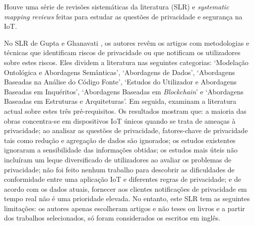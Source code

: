 \documentclass[conference]{IEEEtran}
\begin{document}
Houve uma série de revisões sistemáticas da literatura (SLR) \cite{Gupta2022Privacy, Kuhtreiber2022survey, sicari2015security, LinSurvey}
e \textit{systematic mapping reviews} \cite{porras2018security, ahmed2019aspects}
feitas para estudar as questões de privacidade e segurança na IoT.


No SLR de Gupta e Ghanavati \cite{Gupta2022Privacy}, os autores revêm os
artigos com metodologias e técnicas que identificam riscos de privacidade
ou que notificam os utilizadores sobre estes riscos. Eles dividem a literatura
nas seguintes categorias: `Modelação Ontológica e Abordagens Semânticas',
`Abordagens de Dados', `Abordagens Baseadas na Análise do Código Fonte',
`Estudos do Utilizador e Abordagens Baseadas em Inquéritos', `Abordagens
Baseadas em \textit{Blockchain}' e `Abordagens Baseadas em Estruturas e Arquiteturas'.
Em seguida, examinam a literatura actual sobre estes três pré-requisitos.
Os resultados mostram que: a maioria das obras concentra-se em dispositivos
IoT únicos quando se trata de ameaças à privacidade; ao analisar as questões
de privacidade, fatores-chave de privacidade tais como redução e agregação
de dados são ignorados; os estudos existentes ignoraram a sensibilidade das
informações obtidas; os estudos mais úteis não incluíram um leque diversificado
de utilizadores ao avaliar os problemas de privacidade; não foi feito nenhum
trabalho para descobrir as dificuldades de conformidade entre uma aplicação
IoT e diferentes regras de privacidade; e de acordo com os dados atuais,
fornecer aos clientes notificações de privacidade em tempo real não é uma
prioridade elevada. No entanto, este SLR tem as seguintes limitações: os autores
apenas escolheram artigos e não teses ou livros e a partir dos trabalhos selecionados,
só foram considerados os escritos em inglês.
\end{document}
